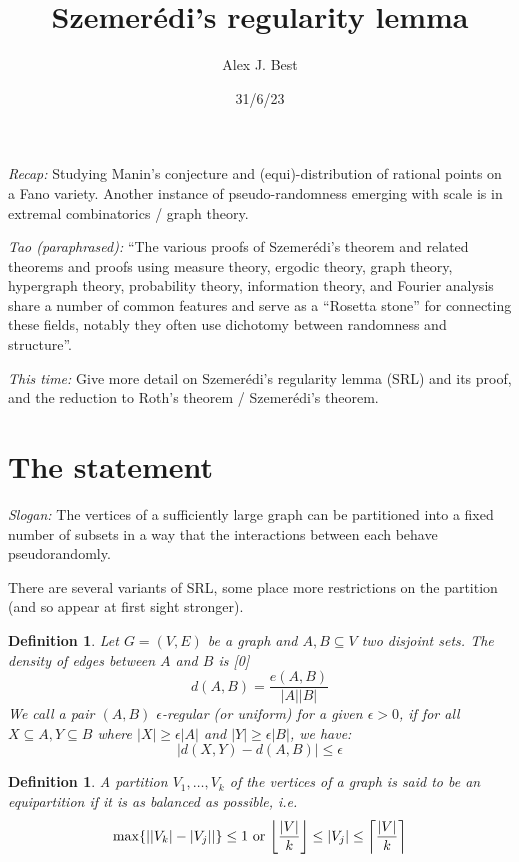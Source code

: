 \documentclass[oneside,12pt,]{article}
\title{Szemerédi's regularity lemma}
\author{Alex J. Best}
\date{31/6/23}
\newtheorem{definition}[theorem]{Definition}
\DeclarePairedDelimiter\ceil{\lceil}{\rceil}
\DeclarePairedDelimiter\floor{\lfloor}{\rfloor}
\begin{document}
\maketitle
\emph{Recap:} Studying Manin's conjecture and (equi)-distribution of rational points on a Fano variety. Another instance of pseudo-randomness emerging with scale is in extremal combinatorics / graph theory.

\emph{Tao (paraphrased):} ``The various proofs of Szemerédi's theorem and related theorems and proofs using measure theory, ergodic theory, graph theory, hypergraph theory, probability theory, information theory, and Fourier analysis share a number of common features and serve as a ``Rosetta stone'' for connecting these fields, notably they often use dichotomy between randomness and structure''.

\emph{This time:} Give more detail on Szemerédi's regularity lemma (SRL) and its proof, and the reduction to Roth's theorem / Szemerédi's theorem.


\section{The statement}

\emph{Slogan:} 
The vertices of a sufficiently large graph can be partitioned into a fixed number of subsets in a way that the interactions between each behave pseudorandomly.

There are several variants of SRL, some place more restrictions on the partition (and so appear at first sight stronger).

\begin{definition}

    Let $G= (V, E)$ be a graph and $A, B \subseteq V$ two disjoint sets.
    The density of edges between $A$ and $B$ is
    [0]
    $$
    d(A, B)=\frac{e(A, B)}{|A||B|}
    $$ %
    We call a pair $(A, B)$ $\epsilon$-regular (or uniform) for a given $\epsilon>0$, if for all $X \subseteq A, Y \subseteq B$ where $|X| \geq \epsilon|A|$ and $|Y| \geq \epsilon|B|$, we have:
    $$
    |d(X, Y)-d(A, B)| \leq \epsilon
    $$
\end{definition}

\begin{definition}
    A partition $V_1, \ldots, V_k$ of the vertices of a graph is said to be an equipartition if it is as balanced as possible, i.e.
$$\max\{||V_k| - |V_j||\}\le 1\text{ or }\floor*{\frac{|V|}k} \le |V_j|\le\ceil*{\frac{|V|}k}$$
\end{definition}
\end{document}
